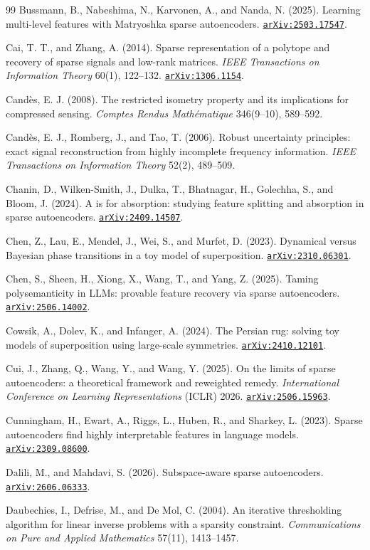 \documentclass[11pt]{amsart}
\newcommand{\arxiv}[1]{\href{https://arxiv.org/abs/#1}{\texttt{arXiv:#1}}}
\theoremstyle{plain}
\theoremstyle{definition}
\begin{document}
\begin{thebibliography}{99}
 Bussmann, B., Nabeshima, N., Karvonen, A., and Nanda, N. (2025). Learning multi-level features with Matryoshka sparse autoencoders. \arxiv{2503.17547}.

 Cai, T. T., and Zhang, A. (2014). Sparse representation of a polytope and recovery of sparse signals and low-rank matrices. \emph{IEEE Transactions on Information Theory} 60(1), 122--132. \arxiv{1306.1154}.

 Cand\`es, E. J. (2008). The restricted isometry property and its implications for compressed sensing. \emph{Comptes Rendus Math\'ematique} 346(9--10), 589--592.

 Cand\`es, E. J., Romberg, J., and Tao, T. (2006). Robust uncertainty principles: exact signal reconstruction from highly incomplete frequency information. \emph{IEEE Transactions on Information Theory} 52(2), 489--509.

 Chanin, D., Wilken-Smith, J., Dulka, T., Bhatnagar, H., Golechha, S., and Bloom, J. (2024). A is for absorption: studying feature splitting and absorption in sparse autoencoders. \arxiv{2409.14507}.

 Chen, Z., Lau, E., Mendel, J., Wei, S., and Murfet, D. (2023). Dynamical versus Bayesian phase transitions in a toy model of superposition. \arxiv{2310.06301}.

 Chen, S., Sheen, H., Xiong, X., Wang, T., and Yang, Z. (2025). Taming polysemanticity in LLMs: provable feature recovery via sparse autoencoders. \arxiv{2506.14002}.

 Cowsik, A., Dolev, K., and Infanger, A. (2024). The Persian rug: solving toy models of superposition using large-scale symmetries. \arxiv{2410.12101}.

 Cui, J., Zhang, Q., Wang, Y., and Wang, Y. (2025). On the limits of sparse autoencoders: a theoretical framework and reweighted remedy. \emph{International Conference on Learning Representations} (ICLR) 2026. \arxiv{2506.15963}.

 Cunningham, H., Ewart, A., Riggs, L., Huben, R., and Sharkey, L. (2023). Sparse autoencoders find highly interpretable features in language models. \arxiv{2309.08600}.

 Dalili, M., and Mahdavi, S. (2026). Subspace-aware sparse autoencoders. \arxiv{2606.06333}.

 Daubechies, I., Defrise, M., and De Mol, C. (2004). An iterative thresholding algorithm for linear inverse problems with a sparsity constraint. \emph{Communications on Pure and Applied Mathematics} 57(11), 1413--1457.


\end{thebibliography}
\end{document}
